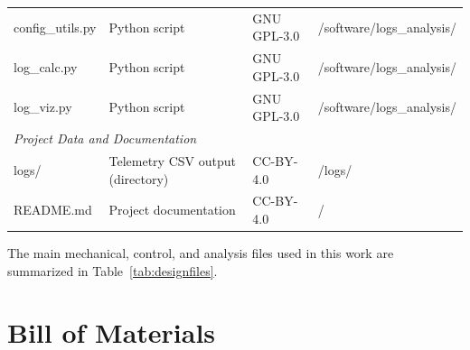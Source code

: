\documentclass[11pt,letterpaper]{article}
\begin{document}
\begin{table}[H]
\begin{tabular}{llll}
config\_utils.py & Python script & GNU GPL-3.0 & /software/logs\_analysis/ \\
log\_calc.py & Python script & GNU GPL-3.0 & /software/logs\_analysis/ \\
log\_viz.py & Python script & GNU GPL-3.0& /software/logs\_analysis/ \\
\midrule
\multicolumn{4}{l}{\textit{Project Data and Documentation}} \\
\midrule
logs/ & Telemetry CSV output (directory) & CC-BY-4.0 & /logs/ \\
README.md & Project documentation & CC-BY-4.0 & / \\
\bottomrule
\end{tabular}
\end{table}

The main mechanical, control, and analysis files used in this work are summarized in Table~\ref{tab:designfiles}.
\newpage

\section{Bill of Materials}
\label{sec:bom}
\end{document}
